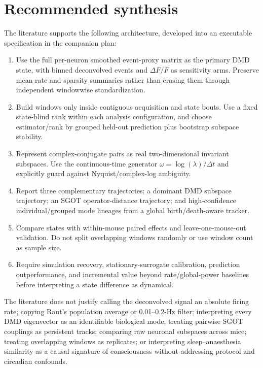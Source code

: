 \documentclass[11pt,a4paper]{article}
\begin{document}
\section{Recommended synthesis}

The literature supports the following architecture, developed into an executable specification in the companion plan:

\begin{enumerate}
  \item Use the full per-neuron smoothed event-proxy matrix as the primary DMD state, with binned deconvolved events and $\Delta F/F$ as sensitivity arms. Preserve mean-rate and sparsity summaries rather than erasing them through independent windowwise standardization.
  \item Build windows only inside contiguous acquisition and state bouts. Use a fixed state-blind rank within each analysis configuration, and choose estimator/rank by grouped held-out prediction plus bootstrap subspace stability.
  \item Represent complex-conjugate pairs as real two-dimensional invariant subspaces. Use the continuous-time generator $\omega=\log(\lambda)/\Delta t$ and explicitly guard against Nyquist/complex-log ambiguity.
  \item Report three complementary trajectories: a dominant DMD subspace trajectory; an SGOT operator-distance trajectory; and high-confidence individual/grouped mode lineages from a global birth/death-aware tracker.
  \item Compare states with within-mouse paired effects and leave-one-mouse-out validation. Do not split overlapping windows randomly or use window count as sample size.
  \item Require simulation recovery, stationary-surrogate calibration, prediction outperformance, and incremental value beyond rate/global-power baselines before interpreting a state difference as dynamical.
\end{enumerate}

\begin{warnbox}
The literature does not justify calling the deconvolved signal an absolute firing rate; copying Raut's population average or 0.01--0.2-Hz filter; interpreting every DMD eigenvector as an identifiable biological mode; treating pairwise SGOT couplings as persistent tracks; comparing raw neuronal subspaces across mice; treating overlapping windows as replicates; or interpreting sleep--anaesthesia similarity as a causal signature of consciousness without addressing protocol and circadian confounds.
\end{warnbox}
\end{document}
